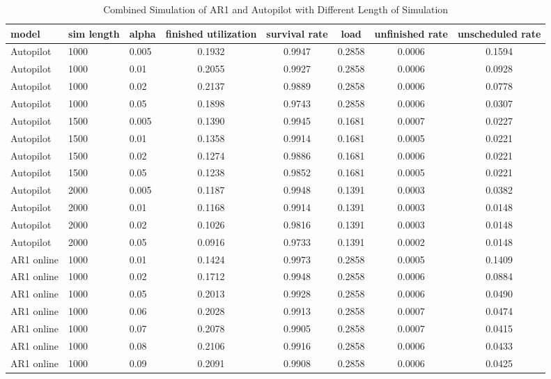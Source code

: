 \documentclass{article}
\begin{document}
\begin{longtable}[htbp]{l|l|l|*{5}{c}}
  \caption{Combined Simulation of AR1 and Autopilot with Different Length of Simulation}
  \label{tab:tab3.2.4} \\
  \textbf{model} & \textbf{sim length} & \textbf{alpha} & \textbf{finished
  utilization} & \textbf{survival rate} & \textbf{load} & \textbf{unfinished
  rate} & \textbf{unscheduled rate} \\
  \hline
  Autopilot & 1000 & 0.005 & 0.1932 & 0.9947 & 0.2858 & 0.0006 & 0.1594\\
  Autopilot & 1000 & 0.01 & 0.2055 & 0.9927 & 0.2858 & 0.0006 & 0.0928\\
  Autopilot & 1000 & 0.02 & 0.2137 & 0.9889 & 0.2858 & 0.0006 & 0.0778\\
  Autopilot & 1000 & 0.05 & 0.1898 & 0.9743 & 0.2858 & 0.0006 & 0.0307\\
  Autopilot & 1500 & 0.005 & 0.1390 & 0.9945 & 0.1681 & 0.0007 & 0.0227\\
  Autopilot & 1500 & 0.01 & 0.1358 & 0.9914 & 0.1681 & 0.0005 & 0.0221\\
  Autopilot & 1500 & 0.02 & 0.1274 & 0.9886 & 0.1681 & 0.0006 & 0.0221\\
  Autopilot & 1500 & 0.05 & 0.1238 & 0.9852 & 0.1681 & 0.0005 & 0.0221\\
  Autopilot & 2000 & 0.005 & 0.1187 & 0.9948 & 0.1391 & 0.0003 & 0.0382\\
  Autopilot & 2000 & 0.01 & 0.1168 & 0.9914 & 0.1391 & 0.0003 & 0.0148\\
  Autopilot & 2000 & 0.02 & 0.1026 & 0.9816 & 0.1391 & 0.0003 & 0.0148\\
  Autopilot & 2000 & 0.05 & 0.0916 & 0.9733 & 0.1391 & 0.0002 & 0.0148\\
  AR1 online & 1000 & 0.01 & 0.1424 & 0.9973 & 0.2858 & 0.0005 & 0.1409\\
  AR1 online & 1000 & 0.02 & 0.1712 & 0.9948 & 0.2858 & 0.0006 & 0.0884\\
  AR1 online & 1000 & 0.05 & 0.2013 & 0.9928 & 0.2858 & 0.0006 & 0.0490\\
  AR1 online & 1000 & 0.06 & 0.2028 & 0.9913 & 0.2858 & 0.0007 & 0.0474\\
  AR1 online & 1000 & 0.07 & 0.2078 & 0.9905 & 0.2858 & 0.0007 & 0.0415\\
  AR1 online & 1000 & 0.08 & 0.2106 & 0.9916 & 0.2858 & 0.0006 & 0.0433\\
  AR1 online & 1000 & 0.09 & 0.2091 & 0.9908 & 0.2858 & 0.0006 & 0.0425\\

\end{longtable}
\end{document}
